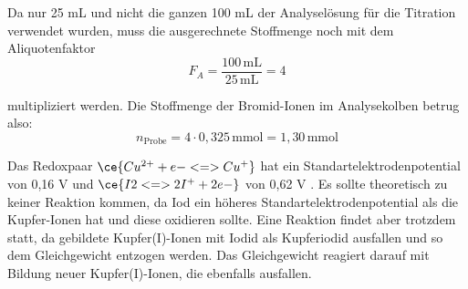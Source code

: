\documentclass[12pt]{scrartcl} %
\begin{document}
Da nur 25 mL und nicht die ganzen 100 mL der Analyselösung für die Titration verwendet wurden, muss die ausgerechnete Stoffmenge noch mit dem Aliquotenfaktor
\begin{equation}
    F_A = \frac{100\,\text{mL}}{25\,\text{mL}} = 4
\end{equation}

multipliziert werden. Die Stoffmenge der Bromid-Ionen im Analysekolben betrug also:
\begin{equation}
    n_{\text{Probe}} = 4 \cdot 0,325\,\text{mmol} = 1,30\,\text{mmol}
\end{equation}

Das Redoxpaar $\ce{Cu^{2+} + e- <=> Cu^+}$ hat ein Standartelektrodenpotential von 0,16 V \cite{Elektrodenpotentiale} und $\ce{I2 <=> 2I^+ + 2e-}$ von 0,62 V \cite{Elektrodenpotentiale}. Es sollte theoretisch zu keiner Reaktion kommen, da Iod ein höheres Standartelektrodenpotential als die Kupfer-Ionen hat und diese oxidieren sollte. Eine Reaktion findet aber trotzdem statt, da gebildete Kupfer(I)-Ionen mit Iodid als Kupferiodid ausfallen und so dem Gleichgewicht entzogen werden. Das Gleichgewicht reagiert darauf mit Bildung neuer Kupfer(I)-Ionen, die ebenfalls ausfallen.\\
\end{document}
